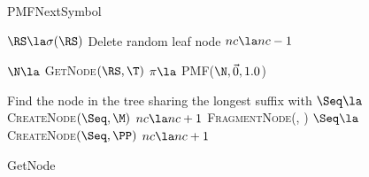 \begin{figure}[ttt!]
	\begin{minipage}[t]{.48\linewidth}
		\begin{algorithm}[H]
			\caption{PMFNextSymbol} \label{alg:pmfnextsymbol}
	\begin{algorithmic}[1]
			\State $\RS \la \sigma(\RS)$
		\EndWhile
			\State Delete random leaf node
			\State $nc \la nc -1$
		\EndWhile
		
		\State $\N \la$ \textsc{GetNode}$(\RS, \T)$
		\State $\pi \la$ \textsc{PMF}($\N, \vec 0, 1.0$) 
		\State \Return [$\pi$, \N]
	\EndFunction
	 \end{algorithmic}
\end{algorithm}
	 \end{minipage}
	\hfill
%
%
%		
%		
%	
	\begin{minipage}[t]{.48\linewidth}
\begin{algorithm}[H]
	\caption{GetNode} \label{alg:getnode}
	\begin{algorithmic}[1]
		\State Find the node \M \space in the tree sharing the longest suffix with \Seq
				\State \Return \M
			\Else
				\State $\Seq \la$ \textsc{CreateNode}$(\Seq, \M)$
				\State $nc \la nc + 1$
				\State \Return \Seq
			\EndIf
		\Else
			\State \PP \la \space \textsc{FragmentNode}(\M, \Seq)
			\State $\Seq \la $ \textsc{CreateNode}$(\Seq, \PP)$
			\State $nc \la nc + 1$
			\State \Return \Seq
		\EndIf
	\EndFunction
	\end{algorithmic}	
\end{algorithm}
	\end{minipage}
	\end{figure}
	

